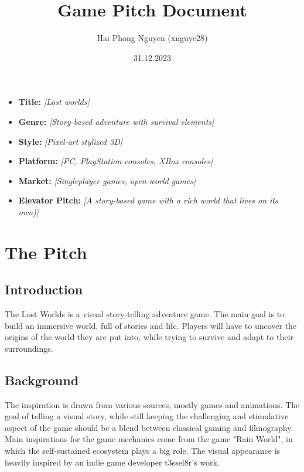 \documentclass[a4paper,10pt,english]{article}
\title{%
Game Pitch Document%
}
\author{%
Hai Phong Nguyen (xnguye28)%
}
\date{31.12.2023}
\newcommand{\ph}[1]{\textit{[#1]}}
\begin{document}
\maketitle
\thispagestyle{empty}

{%
\large

\begin{itemize}

\item[] \textbf{Title:} \ph{Lost worlds}

\item[] \textbf{Genre:} \ph{Story-based adventure with survival elements}

\item[] \textbf{Style:} \ph{Pixel-art stylized 3D}

\item[] \textbf{Platform:} \ph{PC, PlayStation consoles, XBox consoles}

\item[] \textbf{Market:} \ph{Singleplayer games, open-world games}

\item[] \textbf{Elevator Pitch:} \ph{A story-based game with a rich world that lives on its own)}

\end{itemize}

}

\section*{\centering The Pitch}

\subsection*{Introduction}
The Lost Worlds is a visual story-telling adventure game. The main goal is to build an immersive world, full of stories and life. Players will have to uncover the origins of the world they are put into, while trying to survive and adapt to their surroundings.
\subsection*{Background}
The inspiration is drawn from various sources, mostly games and animations. The goal of telling a visual story, while still keeping the challenging and stimulative aspect of the game should be a blend between classical gaming and filmography. Main inspirations for the game mechanics come from the game "Rain World", in which the self-sustained ecosystem plays a big role. The visual appearance is heavily inspired by an indie game developer t3ssel8r's work.
\end{document}
